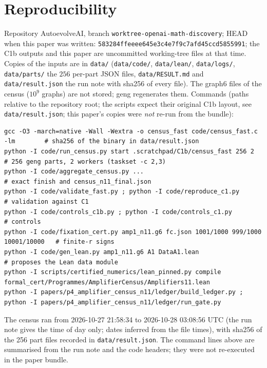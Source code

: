 \documentclass[10pt]{article}
\begin{document}
\section{Reproducibility}\label{sec:repro}
Repository AutoevolveAI, branch \texttt{worktree-openai-math-discovery}; HEAD when this paper was written: \texttt{583284ffeeee645e3c4e7f9c7afd45ccd5855991}; the C1b outputs and this paper are uncommitted working-tree files at that time. Copies of the inputs are in \texttt{data/} (\texttt{data/code/}, \texttt{data/lean/}, \texttt{data/logs/}, \texttt{data/parts/} the $256$ per-part JSON files, \texttt{data/RESULT.md} and \texttt{data/result.json} the run note with sha256 of every file). The graph6 files of the census ($10^9$ graphs) are not stored; geng regenerates them. Commands (paths relative to the repository root; the scripts expect their original C1b layout, see \texttt{data/result.json}; this paper's copies were \emph{not} re-run from the bundle):
\begin{lstlisting}[basicstyle=\ttfamily\scriptsize]
gcc -O3 -march=native -Wall -Wextra -o census_fast code/census_fast.c -lm        # sha256 of the binary in data/result.json
python -I code/run_census.py start .scratchpad/C1b/census_fast 256 2             # 256 geng parts, 2 workers (taskset -c 2,3)
python -I code/aggregate_census.py ...                                           # exact finish and census_n11_final.json
python -I code/validate_fast.py ; python -I code/reproduce_c1.py                 # validation against C1
python -I code/controls_c1b.py ; python -I code/controls_c1.py                   # controls
python -I code/fixation_cert.py amp1_n11.g6 fc.json 1001/1000 999/1000 10001/10000   # finite-r signs
python -I code/gen_lean.py amp1_n11.g6 A1 DataA1.lean                            # proposes the Lean data module
python -I scripts/certified_numerics/lean_pinned.py compile formal_cert/Programmes/AmplifierCensus/Amplifiers11.lean
python -I papers/p4_amplifier_census_n11/ledger/build_ledger.py ; python -I papers/p4_amplifier_census_n11/ledger/run_gate.py
\end{lstlisting}
The census ran from 2026-10-27 21:58:34 to 2026-10-28 03:08:56 UTC (the run note gives the time of day only; dates inferred from the file times), with sha256 of the 256 part files recorded in \texttt{data/result.json}. The command lines above are summarised from the run note and the code headers; they were not re-executed in the paper bundle.
\end{document}
